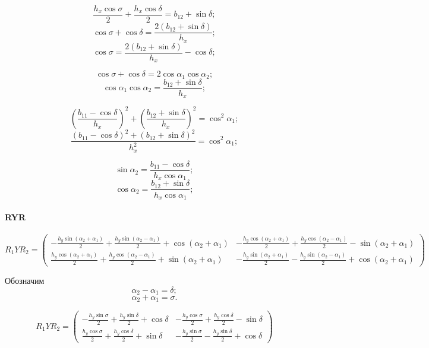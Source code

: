 $$\frac{{h_x}\cos\sigma }{2} + \frac{{h_x}\cos\delta }{2} = b_{12} + \sin\delta;$$
$$\cos\sigma + \cos\delta = \frac{2 (b_{12} + \sin\delta)}{h_x};$$
$$\cos\sigma = \frac{2 (b_{12} + \sin\delta)}{h_x} - \cos\delta;$$

$$\cos\sigma + \cos\delta = 2 \cos\alpha_1 \cos\alpha_2;$$
$$\cos\alpha_1 \cos\alpha_2 = \frac{b_{12} + \sin\delta}{h_x};$$

$$\left( \frac{b_{11} - \cos\delta}{h_x} \right)^2 + \left( \frac{b_{12} + \sin\delta}{h_x} \right)^2 = \cos^2 \alpha_1;$$
$$\frac{\left( b_{11} - \cos\delta \right)^2 + \left(b_{12} + \sin\delta\right)^2}{h_x^2} = \cos^2 \alpha_1;$$

$$\sin\alpha_2 = \frac{b_{11} - \cos\delta}{h_x \cos\alpha_1};$$
$$\cos\alpha_2 = \frac{b_{12} + \sin\delta}{h_x \cos\alpha_1};$$


\paragraph{RYR}

$$R_1YR_2 =
\begin{pmatrix}
-\frac{{h_y} \sin{\left( {\alpha_2}+{\alpha_1}\right) } }{2}+\frac{{h_y} \sin{\left( {\alpha_2}-{\alpha_1}\right) } }{2}+\cos{\left( {\alpha_2}+{\alpha_1}\right) } & 
-\frac{{h_y} \cos{\left( {\alpha_2}+{\alpha_1}\right) } }{2}+\frac{{h_y} \cos{\left( {\alpha_2}-{\alpha_1}\right) } }{2}-\sin{\left( {\alpha_2}+{\alpha_1}\right) }\\
 \frac{{h_y} \cos{\left( {\alpha_2}+{\alpha_1}\right) } }{2}+\frac{{h_y} \cos{\left( {\alpha_2}-{\alpha_1}\right) } }{2}+\sin{\left( {\alpha_2}+{\alpha_1}\right) } & 
-\frac{{h_y} \sin{\left( {\alpha_2}+{\alpha_1}\right) } }{2}-\frac{{h_y} \sin{\left( {\alpha_2}-{\alpha_1}\right) } }{2}+\cos{\left( {\alpha_2}+{\alpha_1}\right) }
\end{pmatrix}
$$

Обозначим 
$$\alpha_2 - \alpha_1 = \delta;$$
$$\alpha_2 + \alpha_1 = \sigma.$$

$$R_1YR_2 =
\begin{pmatrix}
-\frac{{h_y} \sin\sigma }{2}+\frac{{h_y}\sin\delta }{2}+\cos\delta  & 
-\frac{{h_y} \cos\sigma }{2}+\frac{{h_y}\cos\delta }{2}-\sin\delta \\
 \frac{{h_y} \cos\sigma }{2}+\frac{{h_y}\cos\delta }{2}+\sin\delta  & 
-\frac{{h_y} \sin\sigma }{2}-\frac{{h_y}\sin\delta }{2}+\cos\delta 
\end{pmatrix}
$$




